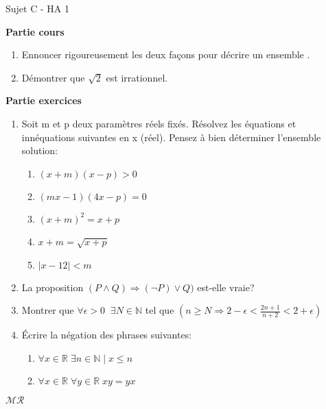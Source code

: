 \documentclass[a4paper,12pt, landscape]{article}
\begin{document}
\begin{multicols*}{3}
\vfill\null
\columnbreak
\centerline{Sujet C - HA 1}
\begin{flushleft}
  \textbf{Partie cours} 
\end{flushleft} 
\begin{enumerate}
  \item Ennoncer rigoureusement les deux façons pour décrire un ensemble .
  \item Démontrer que $\sqrt{2}$ est irrationnel.
\end{enumerate}
\textbf{Partie exercices}
\begin{enumerate}
  \item Soit m et p deux paramètres réels fixés. Résolvez les équations et innéquations suivantes en x (réel). Pensez à bien déterminer l'ensemble solution:
  \begin{enumerate}
    \item $(x+m)(x-p) > 0$
    \item $(mx-1)(4x-p) = 0$
    \item $(x+m)^2 = x+p$
    \item $x+m = \sqrt{x+p}$
    \item $|x-12| < m$
  \end{enumerate}
  \item La proposition $(P \wedge Q) \Rightarrow (\lnot P) \vee Q)$ est-elle vraie? 
  \item Montrer que $\forall \epsilon > 0 \;\; \exists N \in \mathbb{N}$ tel que $(n \geq N \Rightarrow 2 - \epsilon < \frac{2n+1}{n+2} < 2+\epsilon)$
  \item Écrire la négation des phrases suivantes:
  \begin{enumerate}
    \item $\forall x \in \mathbb{R} \; \exists n \in  \mathbb{N} \; | \; x \leq n$
    \item $\forall x \in \mathbb{R} \; \forall y \in \mathbb{R} \; xy = yx$
  \end{enumerate}
\end{enumerate}
\centerline{$\mathcal{MR}$}


\end{multicols*}
\end{document}
